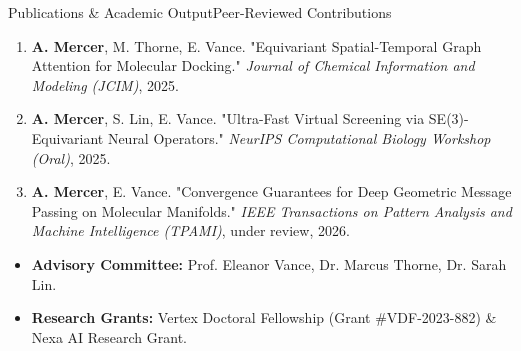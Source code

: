 \documentclass[10pt,aspectratio=169]{beamer}
\begin{document}
\begin{frame}{Publications \& Academic Output}{Peer-Reviewed Contributions}
  \begin{tcolorbox}[defensebox,title={\faBookOpen \quad Key Publications Derived from Dissertation}]
    \tiny
    \begin{enumerate}
      \setlength{\itemsep}{3pt}
      \item \textbf{A. Mercer}, M. Thorne, E. Vance. "Equivariant Spatial-Temporal Graph Attention for Molecular Docking." \textit{Journal of Chemical Information and Modeling (JCIM)}, 2025.
      \item \textbf{A. Mercer}, S. Lin, E. Vance. "Ultra-Fast Virtual Screening via SE(3)-Equivariant Neural Operators." \textit{NeurIPS Computational Biology Workshop (Oral)}, 2025.
      \item \textbf{A. Mercer}, E. Vance. "Convergence Guarantees for Deep Geometric Message Passing on Molecular Manifolds." \textit{IEEE Transactions on Pattern Analysis and Machine Intelligence (TPAMI)}, under review, 2026.
    \end{enumerate}
  \end{tcolorbox}

  \vspace{2pt}
  \begin{tcolorbox}[highlightbox,title={\faHandsHelping \quad Acknowledgments \& Funding}]
    \tiny
    \begin{itemize}
      \item \textbf{Advisory Committee:} Prof. Eleanor Vance, Dr. Marcus Thorne, Dr. Sarah Lin.
      \item \textbf{Research Grants:} Vertex Doctoral Fellowship (Grant \#VDF-2023-882) \& Nexa AI Research Grant.
    \end{itemize}
  \end{tcolorbox}
\end{frame}
\end{document}
